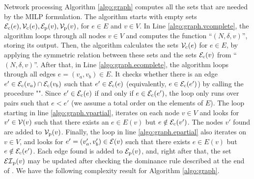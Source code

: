 Network processing Algorithm \ref{algo:graph} computes all the sets that are needed by the MILP formulation. The algorithm  starts with empty sets ${\mathcal E}_{\mathrm{c}}(e), \mathcal V_{\mathrm{c}}(e), {\mathcal E}_{\mathrm{p}}(v), \mathcal V_{\mathrm{p}}(v)$, for $e \in E$ and $v \in V$. In Line \ref{algo:graph.vcomplete}, the algorithm loops through all nodes  $v\in V$ and computes the function ``\ncalgo{}$(N,\delta,v)$'', storing its output. Then, the algorithm calculates the sets $\mathcal V_{\mathrm{c}}(e)$ for $e\in E$, by applying the symmetric relation between these sets and the sets ${\mathcal E}_{\mathrm{c}}(v)$ from ``\ncalgo{}$(N,\delta,v)$''. After that, in Line \ref{algo:graph.ecomplete}, the algorithm loops through all edges $e=(v_a,v_b) \in E$. It checks whether there is an edge $e' \in {\mathcal E}_{\mathrm{c}}(v_a) \cap {\mathcal E}_{\mathrm{c}}(v_b)$ such that $e' \in {\mathcal E}_{\mathrm{c}}(e)$  (equivalently, $e \in {\mathcal E}_{\mathrm{c}}(e')$) by calling the procedure "\malgo". Since $e' \in {\mathcal E}_{\mathrm{c}}(e)$  if and only if $e \in {\mathcal E}_{\mathrm{c}}(e')$, the loop only runs over pairs such that $e<e'$ (we assume a total order on the elements of $E$).  The loop starting in line \ref{algo:graph.vpartial}, iterates on each node $v \in V$ and looks for $v' \in \mathcal V(v)$ such that there exists an $e \in E(v)$ but $e \notin {\mathcal E}_{\mathrm{c}}(v')$. The nodes $v'$ found are added to $\mathcal V_{\mathrm{p}}(v)$. Finally, the loop in line \ref{algo:graph.epartial} also iterates on $v\in V$, and looks for $e'=(v'_a,v'_b) \in {\mathcal E}(v)$ such that there exists $e \in E(v)$ but $e \notin {\mathcal E}_{\mathrm{c}}(e')$. Each edge found is added to ${\mathcal E}_{\mathrm{p}}(v)$, and, right after that, the set ${\mathcal {EI}}_{\mathrm{p}}(v)$ may be updated after checking the dominance rule described at the end of . We have the following complexity result for Algorithm \ref{algo:graph}.

